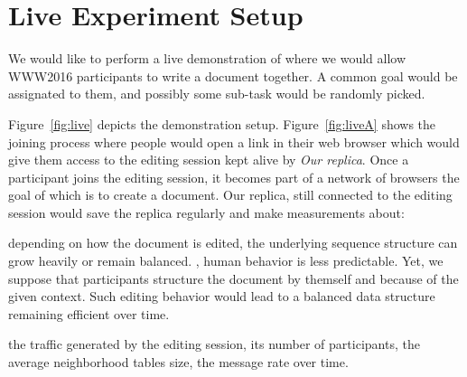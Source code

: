 
\section{Live Experiment Setup}
\label{sec:live}

We would like to perform a live demonstration of \CRATE where we would allow
WWW2016 participants to write a document together. A common goal would be
assignated to them, and possibly some sub-task would be randomly picked.


\begin{figure*}
  \centering
  \hspace{10pt}
  \caption{\label{fig:live} Live demo setup.}
\end{figure*}

Figure~\ref{fig:live} depicts the demonstration setup. Figure~\ref{fig:liveA}
shows the joining process where people would open a link in their web browser
which would give them access to the editing session kept alive by \emph{Our
  replica}. Once a participant joins the editing session, it becomes part of a
network of browsers the goal of which is to create a document. Our replica,
still connected to the editing session would save the replica regularly and make
measurements about:
\begin{asparadesc}
\item [\textbf{the replicated structure size:}] depending on how the document is
  edited, the underlying sequence structure can grow heavily or remain balanced.
  , human behavior is less
  predictable. Yet, we suppose that participants structure the document by
  themself and because of the given context. Such editing behavior would lead to
  a balanced data structure remaining efficient over time. 
\item [\textbf{the network:}] the traffic generated by the editing session, its
  number of participants, the average neighborhood tables size, the message rate
  over time.
\end{asparadesc}





